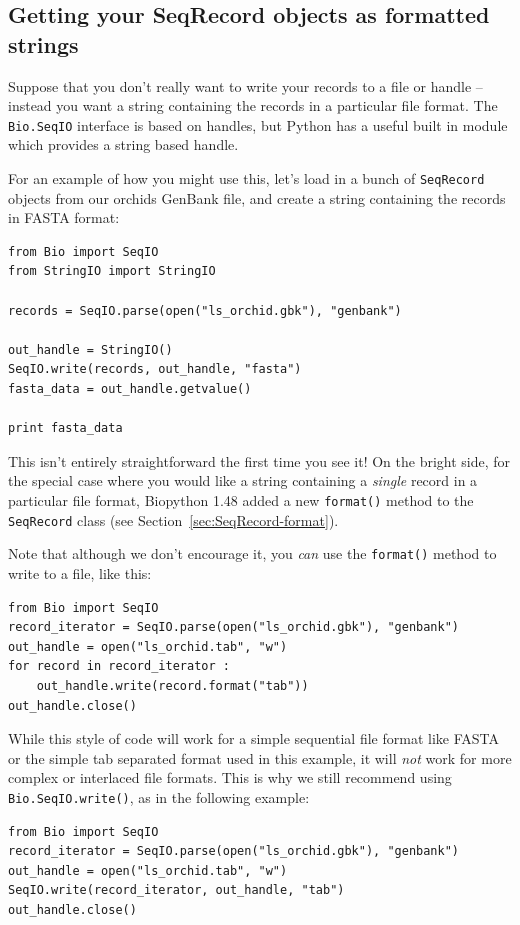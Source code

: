 \documentclass{report}
\begin{document}
\subsection{Getting your SeqRecord objects as formatted strings}
\label{sec:Bio.SeqIO-and-StringIO}
Suppose that you don't really want to write your records to a file or handle -- instead you want a string containing the records in a particular file format.  The \verb|Bio.SeqIO| interface is based on handles, but Python has a useful built in module which provides a string based handle.

For an example of how you might use this, let's load in a bunch of \verb|SeqRecord| objects from our orchids GenBank file, and create a string containing the records in FASTA format:

\begin{verbatim}
from Bio import SeqIO
from StringIO import StringIO

records = SeqIO.parse(open("ls_orchid.gbk"), "genbank")

out_handle = StringIO()
SeqIO.write(records, out_handle, "fasta")
fasta_data = out_handle.getvalue()

print fasta_data
\end{verbatim}

This isn't entirely straightforward the first time you see it!  On the bright side, for the special case where you would like a string containing a \emph{single} record in a particular file format, Biopython 1.48 added a new \verb|format()| method to the \verb|SeqRecord| class (see Section~\ref{sec:SeqRecord-format}).

Note that although we don't encourage it, you \emph{can} use the \verb|format()| method to write to a file, like this:
\begin{verbatim}
from Bio import SeqIO
record_iterator = SeqIO.parse(open("ls_orchid.gbk"), "genbank")
out_handle = open("ls_orchid.tab", "w")
for record in record_iterator :
    out_handle.write(record.format("tab"))
out_handle.close()
\end{verbatim}
\noindent While this style of code will work for a simple sequential file format like FASTA or the simple tab separated format used in this example, it will \emph{not} work for more complex or interlaced file formats.  This is why we still recommend using \verb|Bio.SeqIO.write()|, as in the following example:
\begin{verbatim}
from Bio import SeqIO
record_iterator = SeqIO.parse(open("ls_orchid.gbk"), "genbank")
out_handle = open("ls_orchid.tab", "w")
SeqIO.write(record_iterator, out_handle, "tab")
out_handle.close()
\end{verbatim}
\end{document}
